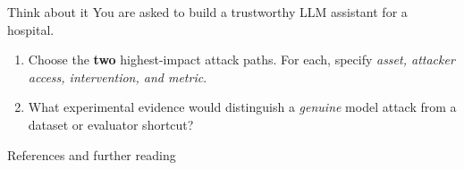 \documentclass[12pt,aspectratio=169,handout]{beamer}
\begin{document}
\begin{frame}{Think about it}
You are asked to build a trustworthy LLM assistant for a hospital.

\vspace{0.6em}
\begin{enumerate}
	\setlength{\itemsep}{0.7em}
	\item Choose the \textbf{two} highest-impact attack paths. For each, specify \emph{asset, attacker access, intervention, and metric}.
	\item What experimental evidence would distinguish a \emph{genuine} model attack from a dataset or evaluator shortcut?
\end{enumerate}
\end{frame}


\setlength{\bibitemsep}{0.35em}
\setlength{\bibhang}{1em}
\begin{frame}[allowframebreaks]{References and further reading}
\scriptsize
\nocite{*}
\printbibliography[keyword=peerreviewed, heading=rubbib, title={Peer-reviewed research}]
\printbibliography[keyword=preprint, heading=rubbib, title={Preprints \& emerging results}]
\printbibliography[keyword=report, heading=rubbib, title={Incident, vendor \& framework reports}]
\end{frame}
\end{document}
